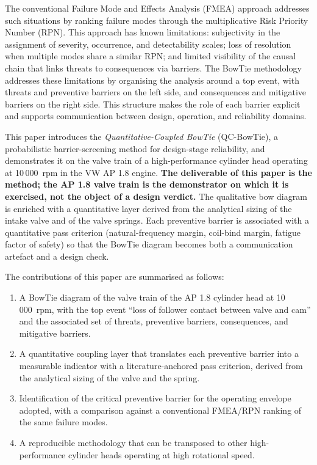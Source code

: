 The conventional Failure Mode and Effects Analysis (FMEA) approach
addresses such situations by ranking failure modes through the
multiplicative Risk Priority Number (RPN). This approach has known
limitations: subjectivity in the assignment of severity, occurrence, and
detectability scales; loss of resolution when multiple modes share a
similar RPN; and limited visibility of the causal chain that links
threats to consequences via barriers. The BowTie methodology addresses
these limitations by organising the analysis around a top event, with
threats and preventive barriers on the left side, and consequences and
mitigative barriers on the right side. This structure makes the role of
each barrier explicit and supports communication between design,
operation, and reliability domains.

This paper introduces the \emph{Quantitative-Coupled BowTie}
(QC-BowTie), a probabilistic barrier-screening method for design-stage
reliability, and demonstrates it on the valve
train of a high-performance cylinder head operating at 10\,000~rpm in the
VW AP 1.8 engine. \textbf{The deliverable of this paper is the method;
the AP 1.8 valve train is the demonstrator on which it is exercised, not
the object of a design verdict.} The qualitative bow diagram is enriched with a
quantitative layer derived from the analytical sizing of the intake
valve and of the valve springs. Each preventive barrier is associated
with a quantitative pass criterion (natural-frequency margin, coil-bind
margin, fatigue factor of safety) so that the BowTie diagram becomes both
a communication artefact and a design check.

The contributions of this paper are summarised as follows:
\begin{enumerate}
\item A BowTie diagram of the valve train of the AP 1.8 cylinder head at
10\,000~rpm, with the top event ``loss of follower contact between valve
and cam'' and the associated set of threats, preventive barriers,
consequences, and mitigative barriers.
\item A quantitative coupling layer that translates each preventive
barrier into a measurable indicator with a literature-anchored pass
criterion, derived from the analytical sizing of the valve and the
spring.
\item Identification of the critical preventive barrier for the operating
envelope adopted, with a comparison against a conventional FMEA/RPN
ranking of the same failure modes.
\item A reproducible methodology that can be transposed to other
high-performance cylinder heads operating at high rotational speed.
\end{enumerate}

